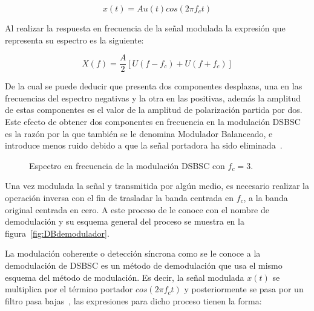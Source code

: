 \vspace{-2mm}
\begin{equation*}
	x(t)=Au(t)cos(2\pi f_ct)
\end{equation*}
\vspace{-4mm}

Al realizar la respuesta en frecuencia de la señal modulada la expresión que representa su espectro es la siguiente:

\vspace{-2mm}
\begin{equation*}
	X(f)=\frac{A}{2} [U(f-f_c)+U(f+f_c)]
\end{equation*}
\vspace{-4mm}

De la cual se puede deducir que presenta dos componentes desplazas, una en las frecuencias del espectro negativas y la otra en las positivas, además la amplitud de estas componentes es el valor de la amplitud de polarización partida por dos. Este efecto de obtener dos componentes en frecuencia en la modulación DSBSC es la razón por la que también se le denomina Modulador Balanceado, e introduce menos ruido debido a que la señal portadora ha sido eliminada~\cite{Zambrano2021}.

\begin{figure}[h]
	\centering
	\def\svgwidth{5cm}
	\tiny{
		
	}
	\vspace{-3mm}
	\caption{\scriptsize Espectro en frecuencia de la modulación DSBSC con $f_c=3$.}
	\vspace{-6mm}
	\label{fig:respuesta_frec}
\end{figure}

Una vez modulada la señal y transmitida por algún medio, es necesario realizar la operación inversa con el fin de trasladar la banda centrada en $f_c$, a la banda original centrada en cero. A este proceso de le conoce con el nombre de demodulación y su esquema general del proceso se muestra en la figura~\ref{fig:DBdemodulador}.

\vspace{-3mm}


La modulación coherente o detección síncrona como se le conoce a la demodulación de DSBSC es un método de demodulación que usa el mismo esquema del método de modulación. Es decir, la señal modulada $x(t)$ se multiplica por el término portador $cos(2\pi f_ct)$ y posteriormente se pasa por un filtro pasa bajas~\cite{TelloPortillo2017}, las expresiones para dicho proceso tienen la forma:

